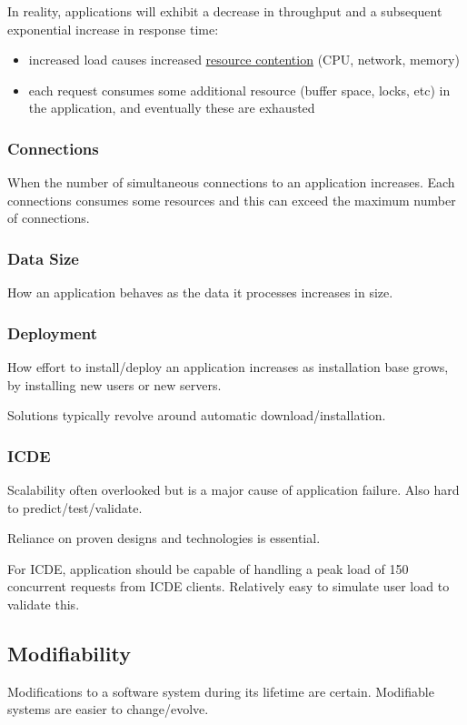 \documentclass[11pt]{article}
\begin{document}
In reality, applications will exhibit a decrease in throughput and a subsequent exponential increase
in response time:
\begin{itemize}
\item increased load causes increased \uline{resource contention} (CPU, network, memory)
\item each request consumes some additional resource (buffer space, locks, etc) in the application,
and eventually these are exhausted
\end{itemize}
\subsubsection{Connections}
\label{sec:org9f9df95}
When the number of simultaneous connections to an application increases.
Each connections consumes some resources and this can exceed the maximum number of connections.
\subsubsection{Data Size}
\label{sec:orgdf516a3}
How an application behaves as the data it processes increases in size.
\subsubsection{Deployment}
\label{sec:orgc47caaa}
How effort to install/deploy an application increases as installation base grows, by installing new
users or new servers.

Solutions typically revolve around automatic download/installation.
\subsubsection{ICDE}
\label{sec:org4fa01c4}
Scalability often overlooked but is a major cause of application failure.
Also hard to predict/test/validate.

Reliance on proven designs and technologies is essential.

For ICDE, application should be capable of handling a peak load of 150 concurrent requests from ICDE
clients.
Relatively easy to simulate user load to validate this.
\subsection{Modifiability}
\label{sec:org3124182}
Modifications to a software system during its lifetime are certain.
Modifiable systems are easier to change/evolve.
\end{document}
